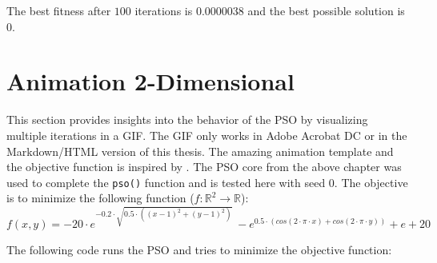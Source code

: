 \documentclass[
  oneside]{book}
\begin{document}
The best fitness after \(100\) iterations is 0.0000038 and the best possible solution is \(0\).

\hypertarget{animation-2-dimensional}{%
\section{Animation 2-Dimensional}\label{animation-2-dimensional}}

This section provides insights into the behavior of the PSO by visualizing multiple iterations in a GIF. The GIF only works in Adobe Acrobat DC or in the Markdown/HTML version of this thesis. The amazing animation template and the objective function is inspired by \citep{Rtic2021}. The PSO core from the above chapter was used to complete the \texttt{pso()} function and is tested here with seed 0. The objective is to minimize the following function (\(f:\mathbb{R}^2 \rightarrow \mathbb{R}\)):
\[
f(x, y) = -20\cdot e^{-0.2 \cdot \sqrt{0.5 \cdot ((x-1)^2 + (y-1)^2)}} \ - e^{0.5 \cdot ( cos(2\cdot \pi \cdot x) + cos(2\cdot \pi \cdot y))} + e + 20
\]

The following code runs the PSO and tries to minimize the objective function:
\end{document}
